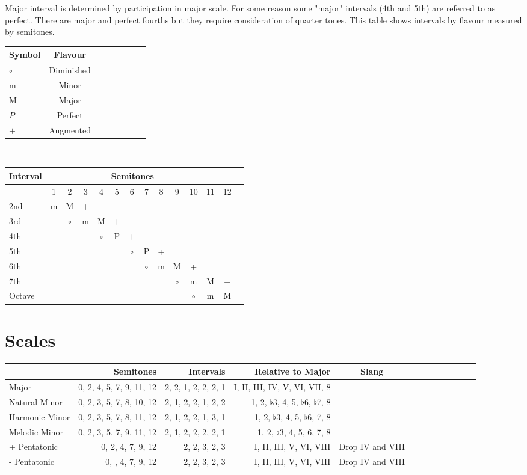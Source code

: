 \documentclass[a4paper]{scrartcl}
\begin{document}
Major interval is determined by participation in major scale. For some reason some "major" intervals (4th and 5th) are referred to as perfect. There are major and perfect fourths but they require consideration of quarter tones. This table shows intervals by flavour measured by semitones.\\
\begin{tabular}
{| l | c | c | c | c | c | c | c |}
\hline 
Symbol & Flavour\\ \hline
$\circ$ & Diminished  \\ \hline
m & Minor  \\ \hline
M & Major \\ \hline
$P$ & Perfect \\ \hline
$+$ & Augmented \\ \hline
\end{tabular}\\
\begin{tabular}
{| l | c | c | c | c | c | c | c | c | c | c | c | c | c | } \hline
Interval & \multicolumn{11}{c}{Semitones} &  \\ \hline
& 1 & 2 & 3 & 4 & 5 & 6 & 7 & 8 & 9 & 10 & 11 & 12 \\ \hline
2nd & m & M & + & & & & & & & & &    \\ \hline
3rd & & $\circ$ & m & M & + & & & & & & & \\ \hline
4th & & & & $\circ$ & P & + & & & & & & \\ \hline
5th & & & & & & $\circ$ & P & + & & & & \\ \hline
6th & & & & & & & $\circ$ & m & M & + & & \\ \hline
7th & & & & & & & & & $\circ$ & m & M & + \\ \hline
Octave & & & & & & & & & & $\circ$ & m & M \\ \hline
\end{tabular}


\section{Scales}
\begin{tabular}
{| l | r | r | r | c | c | c | c | c | c | c | c | c | } \hline
& Semitones & Intervals & Relative to Major & Slang\\ \hline
Major & 0, 2, 4, 5, 7, 9, 11, 12 & 2, 2, 1, 2, 2, 2, 1 & I, II, III, IV, V, VI, VII, 8\\ \hline
Natural Minor & 0, 2, 3, 5, 7, 8, 10, 12 & 2, 1, 2, 2, 1, 2, 2 & 
1, 2, $\flat$3, 4, 5, $\flat$6, $\flat$7, 8\\ \hline 
Harmonic Minor & 0, 2, 3, 5, 7, 8, 11, 12 & 2, 1, 2, 2, 1, 3, 1 & 
1, 2, $\flat$3, 4, 5, $\flat$6, 7, 8 \\ \hline 
Melodic Minor & 0, 2, 3, 5, 7, 9, 11, 12 & 2, 1, 2, 2, 2, 2, 1 & 
1, 2, $\flat$3, 4, 5, 6, 7, 8 \\ \hline 
+ Pentatonic & 0, 2, 4, 7, 9, 12 & 2, 2, 3, 2, 3 & I, II, III, V, VI, VIII & Drop IV and VIII \\ \hline
- Pentatonic & 0, , 4, 7, 9, 12 & 2, 2, 3, 2, 3 & I, II, III, V, VI, VIII & Drop IV and VIII \\ \hline
\end{tabular}
\end{document}
